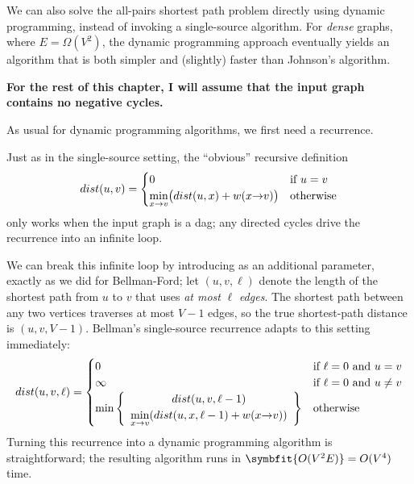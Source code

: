 We can also solve the all-pairs shortest path problem directly using dynamic programming, instead of invoking a single-source algorithm.
For \textit{dense} graphs, where $E = \Omega(V^2)$, the dynamic programming approach eventually yields an algorithm that is both simpler and (slightly) faster than Johnson’s algorithm.

\textbf{For the rest of this chapter, I will assume that the input graph contains no negative cycles.}

As usual for dynamic programming algorithms, we first need a recurrence.

Just as in the single-source setting, the “obvious” recursive definition
\[
dist(u, v) = \begin{cases}
0 & \text{if } u = v\\
\displaystyle\min_{x\mathord{\rightarrow}v} \bigl(dist(u, x) + w(x\mathord{\rightarrow}v)\bigr) & \text{otherwise}
\end{cases}
\]
only works when the input graph is a dag; any directed cycles drive the recurrence into an infinite loop.

We can break this infinite loop by introducing as an additional parameter, exactly as we did for Bellman-Ford; let $(u, v, \ell)$ denote the length of the shortest path from $u$ to $v$ that uses \textit{at most} $\ell$ \textit{edges}.
The shortest path between any two vertices traverses at most $V - 1$ edges, so the true shortest-path distance is $(u, v, V - 1)$.
Bellman’s single-source recurrence adapts to this setting immediately:
\[
dist(u, v, \ell) = \begin{cases}
0 & \text{if } \ell = 0 \text{ and } u = v\\
\infty & \text{if } \ell = 0 \text{ and } u \neq v\\
\min\left\{\begin{array}{c} dist(u, v, \ell - 1)\\ \displaystyle\min_{x\mathord{\rightarrow}v} (dist(u, x, \ell - 1) + w(x\mathord{\rightarrow}v)) \end{array}\right\} & \text{otherwise}
\end{cases}
\]
Turning this recurrence into a dynamic programming algorithm is straightforward; the resulting algorithm runs in $\symbfit{O(V^2E)} = O(V^4)$ time.

